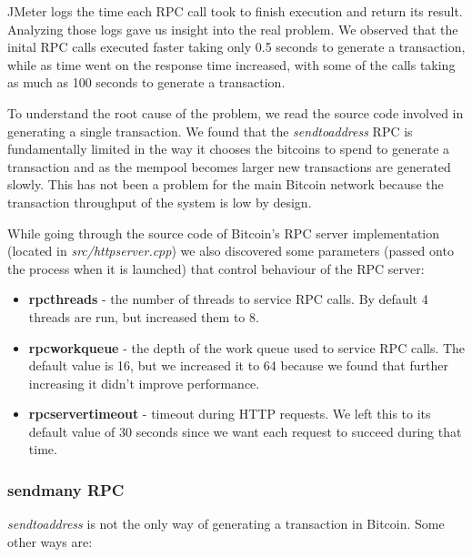 JMeter logs the time each RPC call took to finish execution and return its result. Analyzing those logs gave us insight into the real problem. We observed that the inital RPC calls executed faster taking only 0.5 seconds to generate a transaction, while as time went on the response time increased, with some of the calls taking as much as 100 seconds to generate a transaction. 

To understand the root cause of the problem, we read the source code involved in generating a single transaction. We found that the \textit{sendtoaddress} RPC is fundamentally limited in the way it chooses the bitcoins to spend to generate a transaction and as the mempool becomes larger new transactions are generated slowly. This has not been a problem for the main Bitcoin network because the transaction throughput of the system is low by design.


While going through the source code of Bitcoin's RPC server implementation (located in \textit{src/httpserver.cpp}) we also discovered some parameters (passed onto the process when it is launched) that control behaviour of the RPC server:

\begin{itemize}
    \item \textbf{rpcthreads} - the number of threads to service RPC calls. By default 4 threads are run, but increased them to 8.
    
    \item \textbf{rpcworkqueue} - the depth of the work queue used to service RPC calls. The default value is 16, but we increased it to 64 because we found that further increasing it didn't improve performance.
    
    \item \textbf{rpcservertimeout} - timeout during HTTP requests. We left this to its default value of 30 seconds since we want each request to succeed during that time.
\end{itemize}


\subsubsection{sendmany RPC}

\textit{sendtoaddress} is not the only way of generating a transaction in Bitcoin. Some other ways are:

